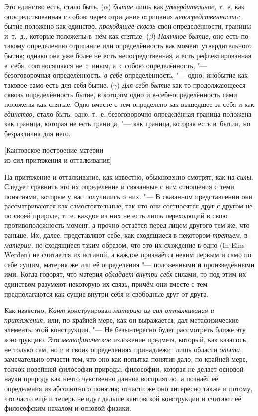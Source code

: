 Это единство есть, стало быть, ($\alpha$) {\em бытие} лишь как
{\em утвердительное,} т.~е. как опосредствованная с собою через отрицание
отрицания {\em непосредственность;} бытие положено как единство,
{\em проходящее сквозь} свои определённости, границы и~т.~д., которые положены
в~нём как снятые. ($\beta$) {\em Наличное бытие;} оно есть по такому
определению отрицание или определённость как момент утвердительного бытия;
однако она уже более не есть непосредственная, а есть рефлектированная в~себя,
соотносящаяся не~с~иным, а~с собою определённость, "--- безоговорочная
определённость, {\em в-себе}-определённость, "--- одно; инобытие как таковое
само есть для-себя-бытие. ($\gamma$) {\em Для-себя-бытие} как то продолжающееся
сквозь определённость бытие, в котором одно и в-себе-определённость сами
положены как снятые. Одно вместе с тем определено как вышедшее за себя и как
{\em единство;} стало быть, одно, т.~е. безоговорочно определённая граница
положена как граница, которая не есть граница, "--- как граница, которая есть
в~бытии, но безразлична для него.

%
{[Кантовское построение материи\\из сил притяжения и отталкивания]}

На притяжение и отталкивание, как известно, обыкновенно смотрят, как на
{\em силы}. Следует сравнить это их определение и
связанные с ним отношения с теми понятиями, которые у нас получились о них.
"--- В сказанном представлении они рассматриваются как самостоятельные, так
что они соотносятся друг с другом не по своей природе, т.~е. каждое из них
не есть лишь переходящий в свою противоположность момент, а прочно остаётся
перед лицом другого тем же, что раньше. Их, далее, представляют себе, как
сходящиеся в некотором {\em третьем,} в
{\em материи,} но сходящиеся таким образом, что это их
схождение в одно (In-Eins-Werden) не считается их истиной, а каждое
признаётся неким первым и само по себе сущим, материя же или её
определения "--- положенными и произведёнными ими. Когда говорят, что материя
{\em обладает внутри себя} силами, то под этим их
единством разумеют некоторую их связь, причём они вместе с тем
предполагаются как сущие внутри себя и свободные друг от друга.

Как известно, {\em Кант} конструировал
{\em материю из сил отталкивания и притяжения,} или, по
крайней мере, как он выражается, дал метафизические элементы этой
конструкции. "--- Не безынтересно будет рассмотреть ближе эту конструкцию. Это
{\em метафизическое} изложение предмета, который, как
казалось, не только сам, но и в своих определениях принадлежит лишь области
{\em опыта,} замечательно отчасти тем, что оно как
попытка понятия дало, по крайней мере, толчок новейшей философии природы,
философии, которая не делает основой науки природу как нечто чувственно
данное восприятию, а познаёт её определения из абсолютного понятия; отчасти
же оно интересно также и потому, что часто ещё и теперь не идут дальше
кантовской конструкции и считают её философским началом и основой физики.

